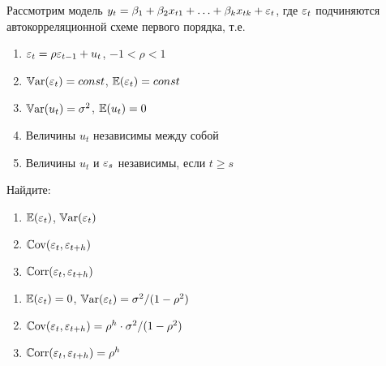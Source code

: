 \begin{problem}
Рассмотрим модель $y_t=\beta_1+\beta_2 x_{t1}+\ldots+\beta_k x_{tk}+\e_t$, где $\e_t$ подчиняются автокорреляционной схеме первого порядка, т.е.
\begin{enumerate}
\item $\e_t=\rho \e_{t-1}+u_t$, $-1<\rho<1$
\item $\Var(\e_t)=const$, $\E(\e_t)=const$
\item $\Var(u_t)=\sigma^2$, $\E(u_t)=0$
\item Величины $u_t$ независимы между собой
\item Величины $u_t$ и $\e_s$ независимы, если $t\geq s$
\end{enumerate}
Найдите:
\begin{enumerate}
\item $\E(\e_t)$, $\Var(\e_t)$
\item $\Cov(\e_t,\e_{t+h})$
\item $\Corr(\e_t,\e_{t+h})$
\end{enumerate}

\begin{sol}
\begin{enumerate}
\item $\E(\e_t)=0$, $\Var(\e_t)=\sigma^2/(1-\rho^2)$
\item $\Cov(\e_t,\e_{t+h})=\rho^h\cdot \sigma^2/(1-\rho^2)$
\item $\Corr(\e_t,\e_{t+h})=\rho^h$
\end{enumerate}
\end{sol}
\end{problem}



